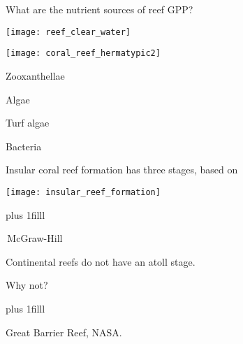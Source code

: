 \documentclass[t]{beamer}
\begin{document}

\begin{frame}[t]{What are the nutrient sources of reef GPP?}
	\begin{multicols}{2}
		\begin{center}
		\texttt{[image: reef\_clear\_water]}
		
		\vspace*{1ex}
		
		\texttt{[image: coral\_reef\_hermatypic2]}
		\end{center}
		
	\columnbreak
	
		\hangpara Zooxanthellae \pause
		
		\hangpara Algae
		
		\hangpara Turf algae \pause
		
		\hangpara Bacteria
		
	\end{multicols}
\end{frame}




\begin{frame}[t]{Insular coral reef formation has three stages, based on }

\texttt{[image: insular\_reef\_formation]}

\vskip0pt plus 1filll

\tiny\textcopyright\,McGraw-Hill
\end{frame}

{
\begin{frame}[t]


\vspace*{2\baselineskip}

\hangpara\hspace*{60mm}\parbox[t]{1.5in}{Continental reefs do not have an atoll stage.}

\vspace*{\baselineskip}

\hangpara\hspace*{60mm}\parbox[t]{1.5in}{Why not?}

\vskip0pt plus 1filll

\hfill\tiny Great Barrier Reef, NASA.
\end{frame}
}
\end{document}
